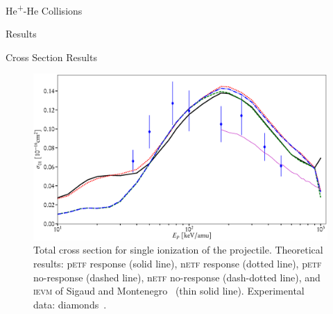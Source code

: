 \documentclass[a5paper, 9 pt]{extreport}
\begin{document}
\begin{chapter}{\texorpdfstring{He\textsuperscript{+}}{He+}-He Collisions \label{chap:hephe}}
\begin{section}{Results \label{sec:hephe-disc}}
\begin{subsection}{Cross Section Results \label{sec:hephe-res}}
         \begin{figure}[t]
            \centering
            \includegraphics[width = \linewidth]{./images/hephe-cross/HepHe-201.eps}
            \caption[Total cross section for single ionization of the projectile in
                     He\textsuperscript{+}-He collisions.]
                    {Total cross section for single ionization of the projectile.
                     Theoretical results: p\textsc{etf} response (solid line), n\textsc{etf} response
                                          (dotted line), p\textsc{etf} no-response (dashed line),
                                          n\textsc{etf} no-response (dash-dotted line), and
                                          \textsc{ievm} of Sigaud and Montenegro~\cite{SM-03}
                                          (thin solid line).
                     Experimental data: diamonds~\cite{Dub-89}. \label{fig:cs201}}
         \end{figure}


\end{subsection}
\end{section}
\end{chapter}
\end{document}
